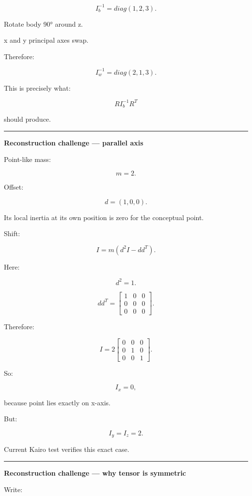 \[
I_b^{-1}
=
diag(1,2,3).
\]

Rotate body 90° around z.

x and y principal axes swap.

Therefore:

\[
I_w^{-1}
=
diag(2,1,3).
\]

This is precisely what:

\[
RI_b^{-1}R^T
\]

should produce.

\begin{center}\rule{0.5\linewidth}{0.5pt}\end{center}

\textbf{Reconstruction challenge --- parallel axis}

Point-like mass:

\[
m=2.
\]

Offset:

\[
d=(1,0,0).
\]

Its local inertia at its own position is zero for the conceptual point.

Shift:

\[
I
=
m(d^2I-dd^T).
\]

Here:

\[
d^2=1.
\]

\[
dd^T
=
\begin{bmatrix}
1&0&0\\
0&0&0\\
0&0&0
\end{bmatrix}.
\]

Therefore:

\[
I
=
2
\begin{bmatrix}
0&0&0\\
0&1&0\\
0&0&1
\end{bmatrix}.
\]

So:

\[
I_x=0,
\]

because point lies exactly on x-axis.

But:

\[
I_y=I_z=2.
\]

Current Kairo test verifies this exact case.

\begin{center}\rule{0.5\linewidth}{0.5pt}\end{center}

\textbf{Reconstruction challenge --- why tensor is symmetric}

Write:

